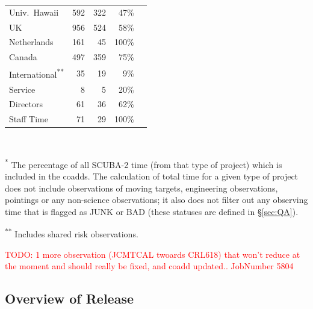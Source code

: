 \documentclass[usenatbib]{mn2e}
\newcommand{\todo}[1]{\textcolor{red}{TODO: #1}}
\newcommand{\status}[1]{\textsf{#1}}
\begin{document}
\begin{table}
{\begin{tabular}{l r r r r}
  \hspace{0.5cm} Univ.~Hawaii   & 592 & 322 &  47\% \\
  \hspace{0.5cm} UK             & 956 & 524 &  58\% \\
  \hspace{0.5cm} Netherlands    & 161 &  45 & 100\%\\
  \hspace{0.5cm} Canada         & 497 & 359 &  75\%\\
  \hspace{0.5cm} International\textsuperscript{**}
                                 &35  &  19 &   9\%\\
  \hspace{0.5cm} Service        &   8 &   5 &  20\%\\
  \hspace{0.5cm} Directors      &  61 &  36 & 62\% \\
  \hspace{0.5cm} Staff Time     &  71 &  29 & 100\%\\
  \hline
\end{tabular}\\}
{\noindent\scriptsize \textsuperscript{*} The percentage of all
  SCUBA-2 time (from that type of project) which is included in the
  coadds. The calculation of total time for a given type of project
  does not include observations of moving targets, engineering
  observations, pointings or any non-science observations; it also
  does not filter out any observing time that is flagged as
  \status{JUNK} or \status{BAD} (these statuses are defined in \S\ref{sec:QA}). }

{\noindent\scriptsize \textsuperscript{**} Includes shared risk observations.}
\end{table}

\todo{ 1 more observation (JCMTCAL twoards CRL618) that won't reduce
  at the moment and should really be fixed, and coadd
  updated.. JobNumber 5804}

\subsection{Overview of Release}
\end{document}
